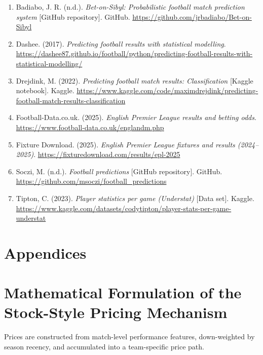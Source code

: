 \documentclass[11pt,a4paper]{article}
\begin{document}
\begin{enumerate}
\item Badiabo, J. R. (n.d.). \textit{Bet-on-Sibyl: Probabilistic football match prediction system} [GitHub repository]. GitHub. \url{https://github.com/jrbadiabo/Bet-on-Sibyl}

\item Dashee. (2017). \textit{Predicting football results with statistical modelling}. \url{https://dashee87.github.io/football/python/predicting-football-results-with-statistical-modelling/}

\item Drejdink, M. (2022). \textit{Predicting football match results: Classification} [Kaggle notebook]. Kaggle. \url{https://www.kaggle.com/code/maximdrejdink/predicting-football-match-results-classification}

\item Football-Data.co.uk. (2025). \textit{English Premier League results and betting odds}. \url{https://www.football-data.co.uk/englandm.php}

\item Fixture Download. (2025). \textit{English Premier League fixtures and results (2024--2025)}. \url{https://fixturedownload.com/results/epl-2025}

\item Soczi, M. (n.d.). \textit{Football predictions} [GitHub repository]. GitHub. \url{https://github.com/msoczi/football_predictions}

\item Tipton, C. (2023). \textit{Player statistics per game (Understat)} [Data set]. Kaggle. \url{https://www.kaggle.com/datasets/codytipton/player-stats-per-game-understat}
\end{enumerate}

\newpage
\appendix
\section*{Appendices}

\section{Mathematical Formulation of the Stock-Style Pricing Mechanism}

Prices are constructed from match-level performance features, down-weighted by season recency,
and accumulated into a team-specific price path.
\end{document}
